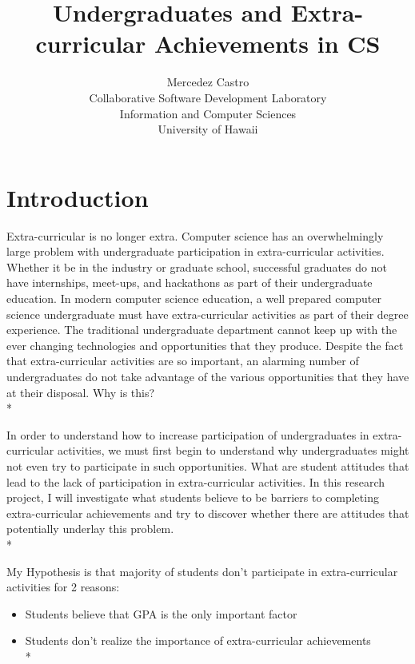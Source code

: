 \documentclass[english]{proposalnsf}
\title{Undergraduates and Extra-curricular Achievements in CS}
\author{Mercedez Castro \\Collaborative Software Development Laboratory \\ Information and Computer Sciences \\ University of Hawaii}
\begin{document}
  \maketitle
  \tableofcontents
  \newpage

  \section{Introduction}
  \label{introduction}

  Extra-curricular is no longer extra.
  Computer science has an overwhelmingly large problem with undergraduate participation in extra-curricular activities.
  Whether it be in the industry or graduate school, successful graduates do not have internships, meet-ups, and hackathons as part of their undergraduate education.
  In modern computer science education, a well prepared computer science undergraduate must have extra-curricular activities as part of their degree experience.
  The traditional undergraduate department cannot keep up with the ever changing technologies and opportunities that they produce.
  Despite the fact that extra-curricular activities are so important, an alarming number of undergraduates do not take advantage of the various opportunities that they have at their disposal.
  Why is this?\\*

  In order to understand how to increase participation of undergraduates in extra-curricular activities, we must first begin to understand why undergraduates might not even try to participate in such opportunities.
  What are student attitudes that lead to the lack of participation in extra-curricular activities.
  In this research project, I will investigate what students believe to be barriers to completing extra-curricular achievements and try to discover whether there are attitudes that potentially underlay this problem.\\*

  My Hypothesis is that majority of students don't participate in extra-curricular activities for 2 reasons:
  \begin{itemize}
    \item Students believe that GPA is the only important factor
    \item Students don't realize the importance of extra-curricular achievements\\*
  \end{itemize}
\end{document}
